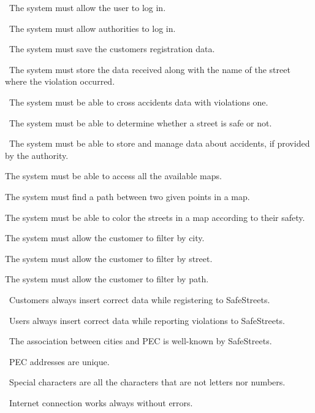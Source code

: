 \begin{description}
\begin{description}
					\item {}\ The system must allow the user to log in.
					\item {}\ The system must allow authorities to log in.
					\item {}\ The system must save the customers registration data.
					\item {}\ The system must store the data received along with the name of the street where the violation occurred.
					\item {}\ The system must be able to cross accidents data with violations one.
					\item {}\ The system must be able to determine whether a street is safe or not.
					\item {}\ The system must be able to store and manage data about accidents, if provided by the authority.
					\item {} The system must be able to access all the available maps.
					\item {} The system must find a path between two given points in a map.
					\item {} The system must be able to color the streets in a map according to their safety.
					\item {} The system must allow the customer to filter by city.
					\item {} The system must allow the customer to filter by street.
					\item {} The system must allow the customer to filter by path.
					\item {}\ Customers always insert correct data while registering to SafeStreets.
					\item {}\ Users always insert correct data while reporting violations to SafeStreets.
					\item {}\ The association between cities and PEC is well-known by SafeStreets.
					\item {}\ PEC addresses are unique.
					\item {}\ Special characters are all the characters that are not letters nor numbers.
					\item {}\ Internet connection works always without errors.

\end{description}
\end{description}
